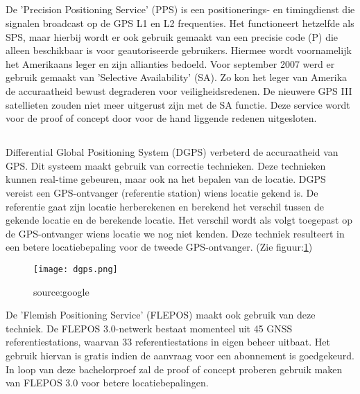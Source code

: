 \subsection{}
De 'Precision Positioning Service' (PPS) is een  positionerings- en timingdienst die signalen broadcast op de GPS L1 en L2 frequenties. Het functioneert hetzelfde als SPS, maar hierbij wordt er ook gebruik gemaakt van een precisie code (P) die alleen beschikbaar is voor geautoriseerde gebruikers. Hiermee wordt voornamelijk het Amerikaans leger en zijn allianties bedoeld. \autocite{pps} Voor september 2007 werd er gebruik gemaakt van 'Selective Availability' (SA). Zo kon het leger van Amerika de accuraatheid bewust degraderen voor veiligheidsredenen. De nieuwere GPS III satellieten zouden niet meer uitgerust zijn met de SA functie. 
\newline
Deze service wordt voor de proof of concept door voor de hand liggende redenen uitgesloten.
\subsection{}
Differential Global Positioning System (DGPS) verbeterd de accuraatheid van GPS. Dit systeem maakt gebruik van correctie technieken. Deze technieken kunnen real-time gebeuren, maar ook na het bepalen van de locatie. DGPS vereist een GPS-ontvanger (referentie station) wiens locatie gekend is. De referentie gaat zijn locatie herberekenen en berekend het verschil tussen de gekende locatie en de berekende locatie. Het verschil wordt als volgt toegepast op de GPS-ontvanger wiens locatie we nog niet kenden. Deze techniek resulteert in een betere locatiebepaling voor de tweede GPS-ontvanger. \autocite{dgps} (Zie figuur:\ref{fig:dgps})
\begin{figure}
	\texttt{[image: dgps.png]}
	\caption{source:google}
	\label{fig:dgps}
\end{figure}
\newline
De 'Flemish Positioning Service' (FLEPOS) maakt ook gebruik van deze techniek. De FLEPOS 3.0-netwerk bestaat momenteel uit 45 GNSS referentiestations, waarvan 33 referentiestations in eigen beheer uitbaat. Het gebruik hiervan is gratis indien de aanvraag voor een abonnement is goedgekeurd. In loop van deze bachelorproef zal de proof of concept proberen gebruik maken van FLEPOS 3.0 voor betere locatiebepalingen. 
